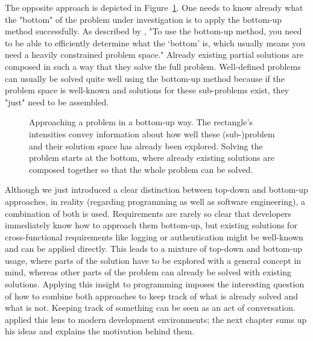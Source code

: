 The opposite approach is depicted in Figure~\ref{fig:bottom-up}.
One needs to know already what the "bottom" of the problem under investigation is to apply the bottom-up method successfully.
As described by \citeauthor{jones_is_2011} \cite{jones_is_2011}, "To use the bottom-up method, you need to be able to efficiently determine what the `bottom' is, which usually means you need a heavily constrained problem space."
Already existing partial solutions are composed in such a way that they solve the full problem.
Well-defined problems can usually be solved quite well using the bottom-up method because if the problem space is well-known and solutions for these sub-problems exist, they "just" need to be assembled.
%
\begin{figure}
\centering
\hspace*{0.15\linewidth}

\caption{Approaching a problem in a bottom-up way. The rectangle's intensities convey information about how well these (sub-)problem and their solution space has already been explored. Solving the problem starts at the bottom, where already existing solutions are composed together so that the whole problem can be solved.}
\label{fig:bottom-up}
\end{figure}

Although we just introduced a clear distinction between top-down and bottom-up approaches, in reality (regarding programming as well as software engineering), a combination of both is used.
Requirements are rarely so clear that developers immediately know how to approach them bottom-up, but existing solutions for cross-functional requirements like logging or authentication might be well-known and can be applied directly.
This leads to a mixture of top-down and bottom-up usage, where parts of the solution have to be explored with a general concept in mind, whereas other parts of the problem can already be solved with existing solutions.
Applying this insight to programming imposes the interesting question of how to combine both approaches to keep track of what is already solved and what is not.
Keeping track of something can be seen as an act of conversation.
\citeauthor{mccabe_towards_2023} applied this lens to modern development environments; the next chapter sums up his ideas and explains the motivation behind them.


